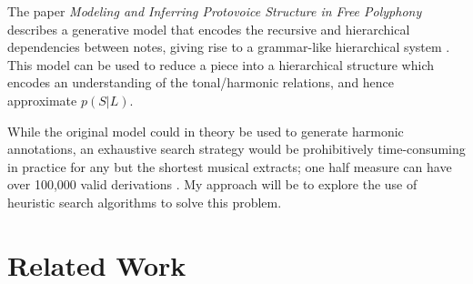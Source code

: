 \documentclass[12pt,a4paper,twoside,openright]{report}
\theoremstyle{definition}
\begin{document}
The paper \textit{Modeling and Inferring Protovoice Structure in Free Polyphony} describes a generative model that encodes the recursive and hierarchical dependencies between notes, giving rise to a grammar-like hierarchical system \cite{finkensiepModelingInferringProtovoice2021}.
This model can be used to reduce a piece into a hierarchical structure which encodes an understanding of the tonal/harmonic relations, and hence approximate $p(S|L)$.


While the original model could in theory be used to generate harmonic annotations, an exhaustive search strategy would be prohibitively time-consuming in practice for any but the shortest musical extracts; one half measure can have over 100,000 valid derivations \cite{finkensiepStructureFreePolyphony2023}. My approach will be to explore the use of heuristic search algorithms to solve this problem.

\section{Related Work}
\end{document}

